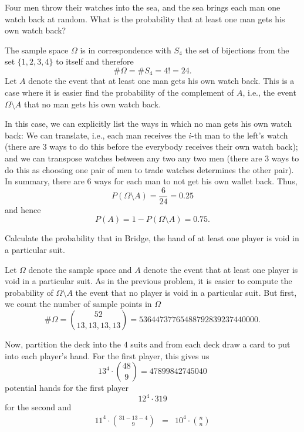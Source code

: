 \begin{problem}[Handout 2, \# 5]
  Four men throw their watches into the sea, and the sea brings each man
  one watch back at random. What is the probability that at least one man
  gets his own watch back?
\end{problem}
\begin{solution}
  The sample space \(\Omega\) is in correspondence with \(S_4\) the set of
  bijections from the set \(\{1,2,3,4\}\) to itself and therefore
  \begin{equation}
    \label{eq:2-1}
    \#\Omega=\# S_4=4!=24.
  \end{equation}
  Let \(A\) denote the event that at least one man gets his own watch
  back. This is a case where it is easier find the probability of the
  complement of \(A\), i.e., the event \(\Omega\setminus A\) that no man
  gets his own watch back.

  In this case, we can explicitly list the ways in which no man gets his
  own watch back: We can translate, i.e., each man receives the \(i\)-th
  man to the left's watch (there are \(3\) ways to do this before the
  everybody receives their own watch back); and we can transpose watches
  between any two any two men (there are \(3\) ways to do this as choosing
  one pair of men to trade watches determines the other pair). In summary,
  there are \(6\) ways for each man to not get his own wallet back. Thus,
  \[
    P(\Omega\setminus A)=\frac{6}{24}=0.25
  \]
  and hence
  \[
    P(A)=1-P(\Omega\setminus A)=0.75.
  \]
\end{solution}
\newpage

\begin{problem}[Handout 2, \#7]
  Calculate the probability that in Bridge, the hand of at least one player
  is void in a particular suit.
\end{problem}
\begin{solution}
  Let \(\Omega\) denote the sample space and \(A\) denote the event that at
  least one player is void in a particular suit. As in the previous
  problem, it is easier to compute the probability of \(\Omega\setminus A\)
  the event that no player is void in a particular suit. But first, we
  count the number of sample points in \(\Omega\)
  \[
    \#\Omega=\binom{52}{13,13,13,13}
    =53644737765488792839237440000.
  \]

  Now, partition the deck into the \(4\) suits and from each deck draw a
  card to put into each player's hand. For the first player, this gives us
  \[
    13^4\cdot\binom{48}{9}=47899842745040
  \]
  potential hands for the first player
  \[
    12^4\cdot{31}{9}
  \]
  for the second and
  \begin{align*}
    11^4\cdot\binom{31-13-4}{9}&=&10^4\cdot\binom{n}{n}
  \end{align*}
\end{solution}
\newpage

